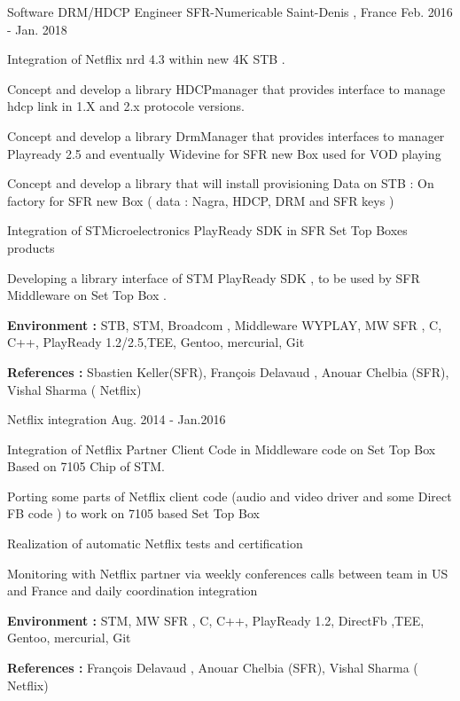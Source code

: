 \begin{cventries}
\cventry
{Software DRM/HDCP Engineer } %
{SFR-Numericable} %
{Saint-Denis , France} %
{Feb. 2016 - Jan. 2018} %
{ %
\begin{cvitems}
\item {Integration of Netflix nrd 4.3 within new 4K STB .}
\item {Concept and develop a library HDCPmanager that provides interface to manage hdcp link in 1.X and 2.x protocole versions.}
\item {Concept and develop a library DrmManager that provides interfaces to manager Playready 2.5 and eventually Widevine for SFR new Box used for VOD playing }
\item {Concept and develop a library that will install provisioning Data on STB : On factory for SFR new Box ( data : Nagra, HDCP, DRM and SFR keys )}
\item {Integration of STMicroelectronics PlayReady SDK in SFR Set Top Boxes products}
\item {Developing a library interface of STM PlayReady SDK , to be used by SFR Middleware on Set Top Box .}
\item { \textbf{Environment :} STB, STM, Broadcom , Middleware WYPLAY, MW SFR , C, C++, PlayReady 1.2/2.5,TEE, Gentoo, mercurial, Git}
\item { \textbf{References :} Sbastien Keller(SFR), François Delavaud , Anouar Chelbia (SFR), Vishal Sharma ( Netflix)}
\end{cvitems}
}


\cventry
{Netflix integration } %
{}{}
{Aug. 2014 - Jan.2016} %
{ %
\begin{cvitems}
\item {Integration of Netflix Partner Client Code in Middleware code on Set Top Box Based on 7105 Chip of STM.}
\item {Porting some parts of Netflix client code (audio and video driver  and some Direct FB code ) to work on 7105 based Set Top Box}
\item {Realization of automatic Netflix tests and certification }
\item {Monitoring with Netflix partner via weekly conferences calls between team in US and France and daily coordination integration}
\item { \textbf{Environment :}  STM, MW SFR , C, C++, PlayReady 1.2, DirectFb ,TEE, Gentoo, mercurial, Git}
\item { \textbf{References :} François Delavaud , Anouar Chelbia (SFR), Vishal Sharma ( Netflix)}
\end{cvitems}
}


\end{cventries}
